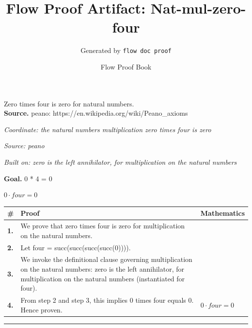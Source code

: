 \documentclass[11pt]{article}
\title{Flow Proof Artifact: Nat-mul-zero-four}
\author{Generated by \texttt{flow doc proof}}
\date{Flow Proof Book}
\theoremstyle{definition}
\begin{document}
\maketitle
Zero times four is zero for natural numbers.\\[0.5em]
\textbf{Source.} peano: https://en.wikipedia.org/wiki/Peano\_axioms\\[0.5em]
\bigskip
{}\par
\smallskip\noindent\textit{Coordinate: the natural numbers \cdot multiplication \cdot zero times four is zero}\par
\smallskip\noindent\textit{Source: peano}\par
\smallskip\noindent\textit{Built on: zero is the left annihilator, for multiplication on the natural numbers}\par
\medskip
\noindent\textbf{Goal.} 0 * 4 = 0\par
\noindent$\displaystyle 0 \cdot four = 0$\par
\medskip
\noindent
\begin{tabular}{@{} >{\raggedright\arraybackslash}p{} >{\raggedright\arraybackslash}p{} >{\raggedleft\arraybackslash}p{} @{}}
\textbf{\#} & \textbf{Proof} & \textbf{Mathematics} \\
\midrule
\textbf{1.} & We prove that zero times four is zero for multiplication on the natural numbers. & \\[0.45em]
\textbf{2.} & Let four = succ(succ(succ(succ(0)))). & \\[0.45em]
\textbf{3.} & We invoke the definitional clause governing multiplication on the natural numbers: zero is the left annihilator, for multiplication on the natural numbers (instantiated for four). & \\[0.45em]
\textbf{4.} & From step 2 and step 3, this implies 0 times four equals 0. Hence proven. & $\displaystyle 0 \cdot four = 0$ \\[0.45em]
\bottomrule
\end{tabular}
\label{thm:Nat-multiplication-zero_times_four_is_zero}
\par\medskip\hrule
\end{document}
